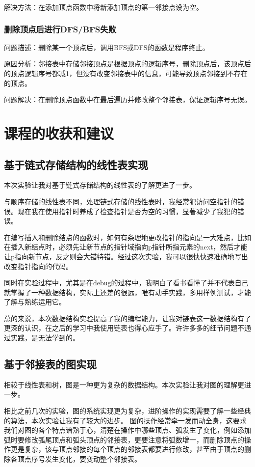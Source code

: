 \documentclass[supercite]{Experimental_Report}
\theoremstyle{definition}
\begin{document}
解决方法：在添加顶点函数中将新添加顶点的第一邻接点设为空。\par
\subsubsection{删除顶点后进行DFS/BFS失败}
问题描述：删除某一个顶点后，调用BFS或DFS的函数是程序终止。\par
原因分析：邻接表中存储邻接顶点是根据顶点的逻辑序号，删除顶点后，该顶点后的顶点逻辑序号都减1，但没有改变邻接表中的信息，可能导致顶点邻接到不存在的顶点。\par
问题解决：在删除顶点函数中在最后遍历并修改整个邻接表，保证逻辑序号无误。\par
\clearpage
\section{课程的收获和建议}
\subsection{基于链式存储结构的线性表实现}
本次实验让我对基于链式存储结构的线性表的了解更进了一步。\par
与顺序存储的线性表不同，处理链式存储的线性表时，我经常犯访问空指针的错误。现在我在使用指针时养成了检查指针是否为空的习惯，显著减少了我犯的错误。\par
在编写插入和删除结点的函数时，如何有条理地更改指针的指向是一大难点，比如在插入新结点时，必须先让新节点的指针域指向p指针所指元素的next，然后才能让p指向新节点，反之则会大错特错。经过这次实验，我可以很快快速准确地写出改变指针指向的代码。\par
同时在实验过程中，尤其是在debug的过程中，我明白了看书看懂了并不代表自己就掌握了一种数据结构，实际上还差的很远，唯有动手实践，多用样例测试，才能了解与熟练运用它。\par
总的来说，本次数据结构实验提高了我的编程能力，让我对链表这一数据结构有了更深的认识，在之后的学习中我使用链表也得心应手了。许许多多的细节问题不通过实践，是无法学到的。\par
\subsection{基于邻接表的图实现}
相较于线性表和树，图是一种更为复杂的数据结构。本次实验让我对图的理解更进一步。\par
相比之前几次的实验，图的系统实现更为复杂，进阶操作的实现需要了解一些经典的算法，本次实验让我有了较大的进步。
图的操作经常牵一发而动全身，这要求我们对图的各个特点谙熟于心，清楚在操作中哪些顶点、弧发生了变化，例如添加弧时要修改弧尾顶点和弧头顶点的邻接表，更要注意将弧数增一，而删除顶点的操作更是复杂，该与顶点邻接的每个顶点的邻接表都要进行修改，甚至由于顶点的删除各顶点序号发生变化，要变动整个邻接表。\par
\end{document}
